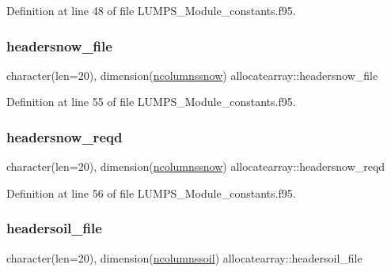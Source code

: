 Definition at line 48 of file L\+U\+M\+P\+S\+\_\+\+Module\+\_\+constants.\+f95.

\mbox{\label{namespaceallocatearray_a3aa165ae073295417f62462fa15676da}} 
\subsubsection{\texorpdfstring{headersnow\+\_\+file}{headersnow\_file}}
{\footnotesize\ttfamily character(len=20), dimension(\hyperlink{namespaceallocatearray_af347c941e3c24ef04005876d0d351505}{ncolumnssnow}) allocatearray\+::headersnow\+\_\+file}



Definition at line 55 of file L\+U\+M\+P\+S\+\_\+\+Module\+\_\+constants.\+f95.

\mbox{\label{namespaceallocatearray_a582758673cb4b699f9845aa05dc3d3b0}} 
\subsubsection{\texorpdfstring{headersnow\+\_\+reqd}{headersnow\_reqd}}
{\footnotesize\ttfamily character(len=20), dimension(\hyperlink{namespaceallocatearray_af347c941e3c24ef04005876d0d351505}{ncolumnssnow}) allocatearray\+::headersnow\+\_\+reqd}



Definition at line 56 of file L\+U\+M\+P\+S\+\_\+\+Module\+\_\+constants.\+f95.

\mbox{\label{namespaceallocatearray_a9031fbce0a0f6d10e36ea7ff3ae3f49b}} 
\subsubsection{\texorpdfstring{headersoil\+\_\+file}{headersoil\_file}}
{\footnotesize\ttfamily character(len=20), dimension(\hyperlink{namespaceallocatearray_a0e0e9877b1623ca21932a4793c7b8641}{ncolumnssoil}) allocatearray\+::headersoil\+\_\+file}



